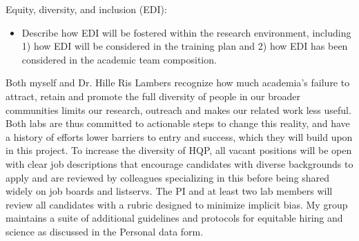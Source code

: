 \documentclass[12pt,oneside]{article}
\newenvironment{smitemize}{
\begin{itemize}
  \setlength{\itemsep}{1pt}
  \setlength{\parskip}{0pt}
  \setlength{\parsep}{0pt}}
{\end{itemize}
}
\begin{document}
{\sc Equity, diversity, and inclusion (EDI):}  %
\vspace{-1ex}
\begin{smitemize}
\item  Describe how EDI will be fostered within the research environment, including 1) how EDI will be considered in the training plan and 2) how EDI has been considered in the academic team composition.
\end{smitemize}
Both myself and Dr. Hille Ris Lambers recognize how much academia's failure to attract, retain and promote the full diversity of people in our broader communities limits our research, outreach and makes our related work less useful. Both labs are thus committed to actionable steps to change this reality, and have a history of efforts lower barriers to entry and success, which they will build upon in this project. To increase the diversity of HQP, all vacant positions will be open with clear job descriptions that encourage candidates with diverse backgrounds to apply and are reviewed by colleagues specializing in this before being shared widely on job boards and listservs.  The PI and at least two lab members will review all candidates with a rubric designed to minimize implicit bias. My group maintains a suite of additional guidelines and protocols for equitable hiring and science as discussed in the Personal data form. %
\end{document}

